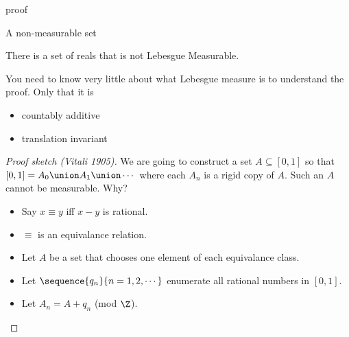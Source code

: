 
\begin{frame}{proof}

\begin{frame}{A non-measurable set}
\begin{theorem}
There is a set of reals that is not Lebesgue Measurable.
\end{theorem}

\vfill

\pause
You need to know very little  about what Lebesgue measure is to
understand the proof. Only that it is
\begin{itemize}
  \item countably additive
  \item translation invariant
\end{itemize}

\end{frame}

\begin{proof}[Proof sketch (Vitali 1905)]
We are going to construct a set
$A \subseteq [0, 1]$ so that $[0,1] = A_0 \union A_1 \union \cdots$ where each
$A_n$ is a rigid copy of $A$. Such an $A$ cannot be measurable. Why?

\begin{itemize}
  \item Say $x\equiv y$ iff $x-y$ is rational.
  \item $\equiv$ is an equivalance relation.
  \item Let $A$ be a set that chooses one element of each equivalance class.
  \item Let $\sequence{q_n}{n = 1,2,\cdots}$ enumerate all rational numbers in
$[0,1]$.
   \item Let $A_n = A + q_n$ (mod $\Z$).
\end{itemize}
\end{proof}
\end{frame}

